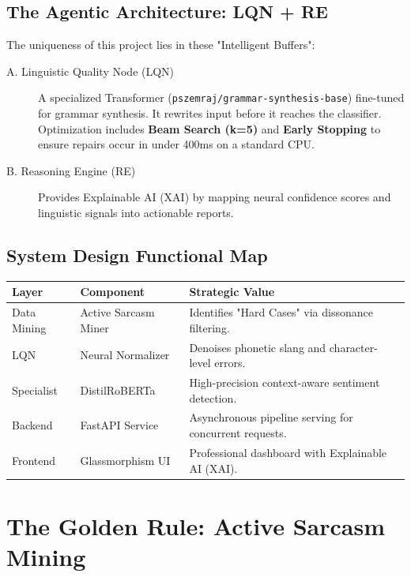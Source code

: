 \documentclass[11pt,oneside]{scrbook}
\begin{document}
\section{The Agentic Architecture: LQN + RE}
The uniqueness of this project lies in these "Intelligent Buffers":
\begin{description}
    \item[A. Linguistic Quality Node (LQN)] A specialized Transformer (\texttt{pszemraj/grammar-synthesis-base}) fine-tuned for grammar synthesis. It rewrites input before it reaches the classifier. Optimization includes \textbf{Beam Search (k=5)} and \textbf{Early Stopping} to ensure repairs occur in under 400ms on a standard CPU.
    \item[B. Reasoning Engine (RE)] Provides Explainable AI (XAI) by mapping neural confidence scores and linguistic signals into actionable reports.
\end{description}

\section{System Design Functional Map}
\begin{longtable}{p{2.5cm}p{3.5cm}p{7.5cm}}
\toprule
\textbf{Layer} & \textbf{Component} & \textbf{Strategic Value} \\
\midrule
Data Mining & Active Sarcasm Miner & Identifies "Hard Cases" via dissonance filtering. \\
LQN & Neural Normalizer & Denoises phonetic slang and character-level errors. \\
Specialist & DistilRoBERTa & High-precision context-aware sentiment detection. \\
Backend & FastAPI Service & Asynchronous pipeline serving for concurrent requests. \\
Frontend & Glassmorphism UI & Professional dashboard with Explainable AI (XAI). \\
\bottomrule
\end{longtable}

\cleardoublepage
\chapter{The Golden Rule: Active Sarcasm Mining}
\end{document}
